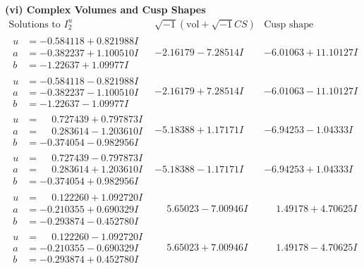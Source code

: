 \documentclass[1p]{elsarticle_modified}
\theoremstyle{definition}
\newcommand{\I}{\sqrt{-1}}
\begin{document}
\newpage\flushleft \textbf{(vi) Complex Volumes and Cusp Shapes}
$$\begin{array}{c|c|c}  
\text{Solutions to }I^u_{2}& \I (\text{vol} + \sqrt{-1}CS) & \text{Cusp shape}\\
 \hline 
\begin{aligned}
u &= -0.584118 + 0.821988 I \\
a &= -0.382237 + 1.100510 I \\
b &= -1.22637 + 1.09977 I\end{aligned}
 & -2.16179 - 7.28514 I & -6.01063 + 11.10127 I \\ \hline\begin{aligned}
u &= -0.584118 - 0.821988 I \\
a &= -0.382237 - 1.100510 I \\
b &= -1.22637 - 1.09977 I\end{aligned}
 & -2.16179 + 7.28514 I & -6.01063 - 11.10127 I \\ \hline\begin{aligned}
u &= \phantom{-}0.727439 + 0.797873 I \\
a &= \phantom{-}0.283614 - 1.203610 I \\
b &= -0.374054 - 0.982956 I\end{aligned}
 & -5.18388 + 1.17171 I & -6.94253 - 1.04333 I \\ \hline\begin{aligned}
u &= \phantom{-}0.727439 - 0.797873 I \\
a &= \phantom{-}0.283614 + 1.203610 I \\
b &= -0.374054 + 0.982956 I\end{aligned}
 & -5.18388 - 1.17171 I & -6.94253 + 1.04333 I \\ \hline\begin{aligned}
u &= \phantom{-}0.122260 + 1.092720 I \\
a &= -0.210355 + 0.690329 I \\
b &= -0.293874 - 0.452780 I\end{aligned}
 & \phantom{-}5.65023 - 7.00946 I & \phantom{-}1.49178 + 4.70625 I \\ \hline\begin{aligned}
u &= \phantom{-}0.122260 - 1.092720 I \\
a &= -0.210355 - 0.690329 I \\
b &= -0.293874 + 0.452780 I\end{aligned}
 & \phantom{-}5.65023 + 7.00946 I & \phantom{-}1.49178 - 4.70625 I \\ \hline\begin{aligned}

\end{aligned}
\end{array}$$
\end{document}
